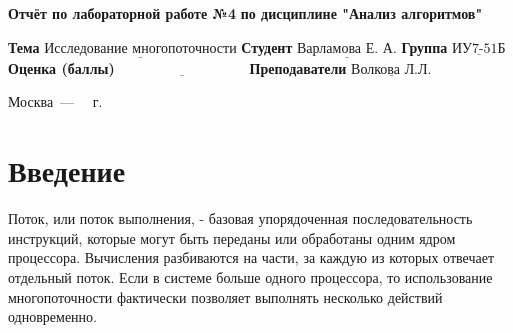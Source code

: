 \documentclass[12pt]{report}
\begin{document}
\begin{titlepage}
	
	\begin{center}
		\noindent\begin{minipage}{1.3\textwidth}\centering
			\Large\textbf{  Отчёт по лабораторной работе №4}\newline
			\textbf{по дисциплине "Анализ алгоритмов"}\newline\newline
		\end{minipage}
	\end{center}
	
	\noindent\textbf{Тема} $\underline{\text{Исследование многопоточности}}$\newline\newline
	\noindent\textbf{Студент} $\underline{\text{Варламова Е. А.}}$\newline\newline
	\noindent\textbf{Группа} $\underline{\text{ИУ7-51Б}}$\newline\newline
	\noindent\textbf{Оценка (баллы)} $\underline{\text{~~~~~~~~~~~~~~~~~~~~~~~~~~~}}$\newline\newline
	\noindent\textbf{Преподаватели} $\underline{\text{Волкова Л.Л.}}$\newline\newline\newline
	
	\begin{center}
		\vfill
		Москва~---~\the\year
		~г.
	\end{center}
\end{titlepage}

\setcounter{page}{2}
\tableofcontents

\newpage
\chapter*{Введение}

Поток, или поток выполнения, - базовая упорядоченная последовательность инструкций, которые могут быть переданы или обработаны одним ядром процессора. Вычисления разбиваются на части, за каждую из которых отвечает отдельный поток. Если в системе больше одного процессора, то использование многопоточности фактически позволяет выполнять несколько действий одновременно.
\end{document}
